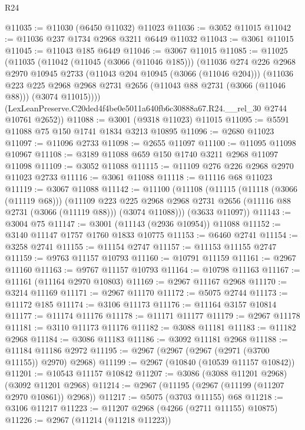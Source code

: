 \begin{lexlean}{R24}
\begin{coremodule}
@11035 := @11030 (@6450 @11032) @11023
@11036 := @3052 @11015
@11042 := @11036 @237 @1734 @2968 @3211 @6449 @11032
@11043 := @3061 @11015
@11045 := @11043 @185 @6449
@11046 := @3067 @11015
@11085 := @11025
    (@11035
      (@11042
        (@11045 (@3066 (@11046 @185)))
        (@11036
          @274
          @226
          @2968
          @2970
          @10945
          @2733
          (@11043 @204 @10945 (@3066 (@11046 @204)))
          (@11036
            @223
            @225
            @2968
            @2968
            @2731
            @2656
            (@11043 @88 @2731 (@3066 (@11046 @88)))
            (@3074 @11015))))
      (LexLeanPreserve.C20ded4f4be0e5011a640fb6c30888a67.R24.__rel_30 @2744 @10761 @2652))
@11088 := @3001 (@9318 @11023) @11015
@11095 := @5591 @11088 @75 @150 @1741 @1834 @3213 @10895
@11096 := @2680 @11023
@11097 := @11096 @2733
@11098 := @2655 @11097
@11100 := @11095 @11098 @10967
@11108 := @3189 @11088 @659 @150 @1740 @3211 @2968 @11097 @11098
@11109 := @3052 @11088
@11115 := @11109 @276 @226 @2968 @2970 @11023 @2733
@11116 := @3061 @11088
@11118 := @11116 @68 @11023
@11119 := @3067 @11088
@11142 := @11100
    (@11108
      (@11115
        (@11118 (@3066 (@11119 @68)))
        (@11109
          @223
          @225
          @2968
          @2968
          @2731
          @2656
          (@11116 @88 @2731 (@3066 (@11119 @88)))
          (@3074 @11088)))
      (@3633 @11097))
@11143 := @3004 @75
@11147 := @3001 (@11143 (@2936 @10954)) @11088
@11152 := @3140 @11147 @1757 @1760 @1833 @10775
@11153 := @6460 @2741
@11154 := @3258 @2741
@11155 := @11154 @2747
@11157 := @11153 @11155 @2747
@11159 := @9763 @11157 @10793
@11160 := @10791 @11159
@11161 := @2967 @11160
@11163 := @9767 @11157 @10793
@11164 := @10798 @11163
@11167 := @11161 (@11164 @2970 @10803)
@11169 := @2967 @11167 @2968
@11170 := @3214 @11169
@11171 := @2967 @11170
@11172 := @5075 @2744
@11173 := @11172 @185
@11174 := @3106 @11173
@11176 := @11164 @3157 @10814
@11177 := @11174 @11176
@11178 := @11171 @11177
@11179 := @2967 @11178
@11181 := @3110 @11173 @11176
@11182 := @3088 @11181
@11183 := @11182 @2968
@11184 := @3086 @11183
@11186 := @3092 @11181 @2968
@11188 := @11184 @11186 @2972
@11195 := @2967 (@2967 (@2967 (@2971 (@3700 @11155)) @2970) @2968)
@11199 := @2967 (@10840 (@10539 @11157 @10842))
@11201 := @10543 @11157 @10842
@11207 := @3086 (@3088 @11201 @2968) (@3092 @11201 @2968)
@11214 := @2967 (@11195 (@2967 (@11199 (@11207 @2970 @10861)) @2968))
@11217 := @5075 (@3703 @11155) @68
@11218 := @3106 @11217
@11223 := @11207 @2968 (@4266 (@2711 @11155) @10875)
@11226 := @2967 (@11214 (@11218 @11223))

\end{coremodule}
\end{lexlean}
